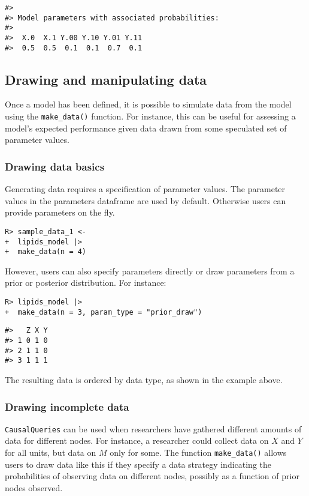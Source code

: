 \documentclass[
  11pt,
  article]{jss}
\begin{document}
\begin{verbatim}
#> 
#> Model parameters with associated probabilities: 
#> 
#>  X.0  X.1 Y.00 Y.10 Y.01 Y.11 
#>  0.5  0.5  0.1  0.1  0.7  0.1
\end{verbatim}

\subsection{Drawing and manipulating
data}\label{drawing-and-manipulating-data}

Once a model has been defined, it is possible to simulate data from the
model using the \texttt{make\_data()} function. For instance, this can
be useful for assessing a model's expected performance given data drawn
from some speculated set of parameter values.

\subsubsection{Drawing data basics}\label{drawing-data-basics}

Generating data requires a specification of parameter values. The
parameter values in the parameters dataframe are used by default.
Otherwise users can provide parameters on the fly.

\begin{verbatim}
R> sample_data_1 <- 
+  lipids_model |> 
+  make_data(n = 4)
\end{verbatim}

However, users can also specify parameters directly or draw parameters
from a prior or posterior distribution. For instance:

\begin{verbatim}
R> lipids_model |>
+  make_data(n = 3, param_type = "prior_draw")
\end{verbatim}

\begin{verbatim}
#>   Z X Y
#> 1 0 1 0
#> 2 1 1 0
#> 3 1 1 1
\end{verbatim}

The resulting data is ordered by data type, as shown in the example
above.

\subsubsection{Drawing incomplete data}\label{drawing-incomplete-data}

\texttt{CausalQueries} can be used when researchers have gathered
different amounts of data for different nodes. For instance, a
researcher could collect data on \(X\) and \(Y\) for all units, but data
on \(M\) only for some. The function \texttt{make\_data()} allows users
to draw data like this if they specify a data strategy indicating the
probabilities of observing data on different nodes, possibly as a
function of prior nodes observed.
\end{document}
